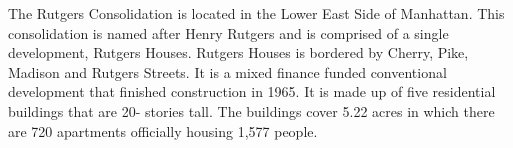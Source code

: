 The Rutgers Consolidation is located in the Lower East Side of Manhattan. This consolidation is named after Henry Rutgers and is comprised of a single development, Rutgers Houses. Rutgers Houses is bordered by Cherry, Pike, Madison and Rutgers Streets. It is a mixed finance funded conventional development that finished construction in 1965. It is made up of five residential buildings that are 20- stories tall. The buildings cover 5.22 acres in which there are 720 apartments officially housing 1,577 people.